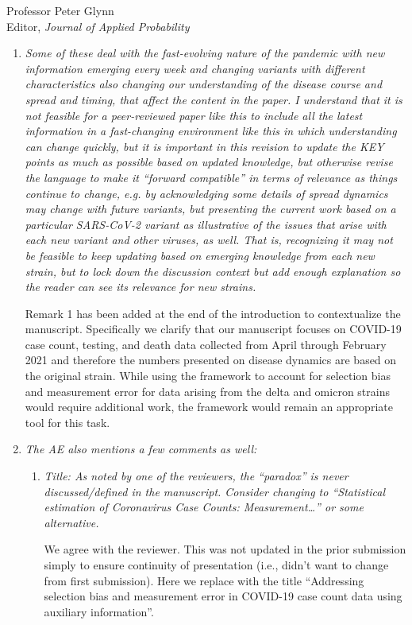 \documentclass[11pt]{letter} %
\begin{document}
\begin{letter}{Professor
	Peter Glynn\\
	Editor, {\em Journal of Applied Probability}}
\begin{enumerate}
\item {\it Some of these deal with the fast-evolving nature of the pandemic with new information emerging every week and changing variants with different characteristics also changing our understanding of the disease course and spread and timing, that affect the content in the paper. I understand that it is not feasible for a peer-reviewed paper like this to include all the latest information in a fast-changing environment like this in which understanding can change quickly, but it is important in this revision to update the KEY points as much as possible based on updated knowledge, but otherwise revise the language to make it “forward compatible” in terms of relevance as things continue to change, e.g. by acknowledging some details of spread dynamics may change with future variants, but presenting the current work based on a particular SARS-CoV-2 variant as illustrative of the issues that arise with each new variant and other viruses, as well. That is, recognizing it may not be feasible to keep updating based on emerging knowledge from each new strain, but to lock down the discussion context but add enough explanation so the reader can see its relevance for new strains.}

\vspace{5mm}
Remark 1 has been added at the end of the introduction to contextualize the manuscript. Specifically we clarify that our manuscript focuses on COVID-19 case count, testing, and death data collected from April through February 2021 and therefore the numbers presented on disease dynamics are based on the original strain. While using the framework to account for selection bias and measurement error for data arising from the delta and omicron strains would require additional work, the framework would remain an appropriate tool for this task.
\vspace{5mm}

\item {\it The AE also mentions a few comments as well:}
\begin{enumerate}
	\item {\it Title: As noted by one of the reviewers, the “paradox” is never discussed/defined in the manuscript. Consider changing to “Statistical estimation of Coronavirus Case Counts: Measurement…” or some alternative.}
	\vspace{5mm}

	We agree with the reviewer. This was not updated in the prior submission simply to ensure continuity of presentation (i.e., didn’t want to change from first submission). Here we replace with the title “Addressing selection bias and measurement error in COVID-19 case count data using auxiliary information”.


\end{enumerate}
\end{enumerate}
\end{letter}
\end{document}
